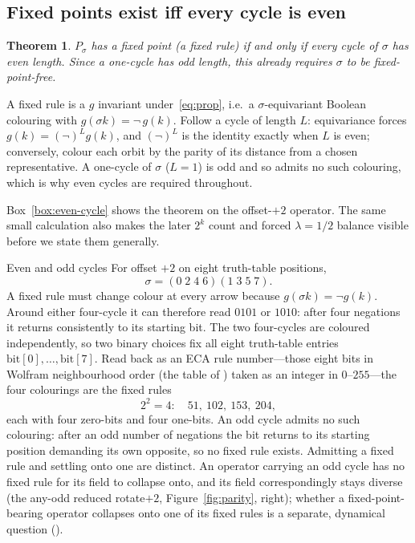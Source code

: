 \documentclass[man,12pt,floatsintext]{apa7}
\newcommand{\sig}{\sigma}
\newcommand{\bit}[1]{\mathrm{bit}[#1]}
\newcommand{\secref}[1]{\emph{\nameref{#1}}}
\newtheorem{theorem}{Theorem}
\begin{document}
\subsection{Fixed points exist iff every cycle is even}

\begin{theorem}\label{thm:parity}
$P_\sig$ has a fixed point (a fixed rule) if and only if every cycle of
$\sig$ has even length. Since a one-cycle has odd length, this already
requires $\sig$ to be fixed-point-free.
\end{theorem}

\noindent A fixed rule is a $g$ invariant under~\eqref{eq:prop}, i.e.\ a
$\sig$-equivariant Boolean colouring with $g(\sig k) = \lnot\,g(k)$.
Follow a cycle of length $L$: equivariance forces
$g(k) = (\lnot)^{L} g(k)$, and $(\lnot)^{L}$ is the identity exactly when
$L$ is even; conversely, colour each orbit by the parity of its distance
from a chosen representative. A one-cycle of $\sig$ ($L=1$) is odd and so
admits no such colouring, which is why even cycles are required throughout.

Box~\ref{box:even-cycle} shows the theorem on the offset-$+2$ operator. The
same small calculation also makes the later $2^k$ count and forced
$\lambda=1/2$ balance visible before we state them generally.

\begin{workedexample}[label={box:even-cycle}]{Even and odd cycles}
\small
For offset $+2$ on eight truth-table positions,
\[
\sig=(0\;2\;4\;6)(1\;3\;5\;7).
\]
A fixed rule must change colour at every arrow because
$g(\sig k)=\lnot g(k)$. Around either four-cycle it can therefore read
$0101$ or $1010$: after four negations it returns consistently to its
starting bit. The two four-cycles are coloured independently, so two binary
choices fix all eight truth-table entries $\bit{0},\dots,\bit{7}$. Read back as
an ECA rule number---those eight bits in Wolfram neighbourhood order (the table
of \secref{sec:object}) taken as an integer in $0$--$255$---the four colourings
are the fixed rules
\[
2^2=4:\quad
51,\ 102,\ 153,\ 204,
\]
each with four zero-bits and four one-bits. An odd cycle admits no such
colouring: after an odd number of negations the bit returns to its starting
position demanding its own opposite, so no fixed rule exists. Admitting a fixed
rule and settling onto one are distinct. An operator carrying an odd cycle has no
fixed rule for its field to collapse onto, and its field correspondingly stays
diverse (the any-odd reduced rotate$+2$, Figure~\ref{fig:parity}, right); whether
a fixed-point-bearing operator collapses onto one of its fixed rules is a
separate, dynamical question (\secref{sec:interrupter}).
\end{workedexample}
\end{document}
